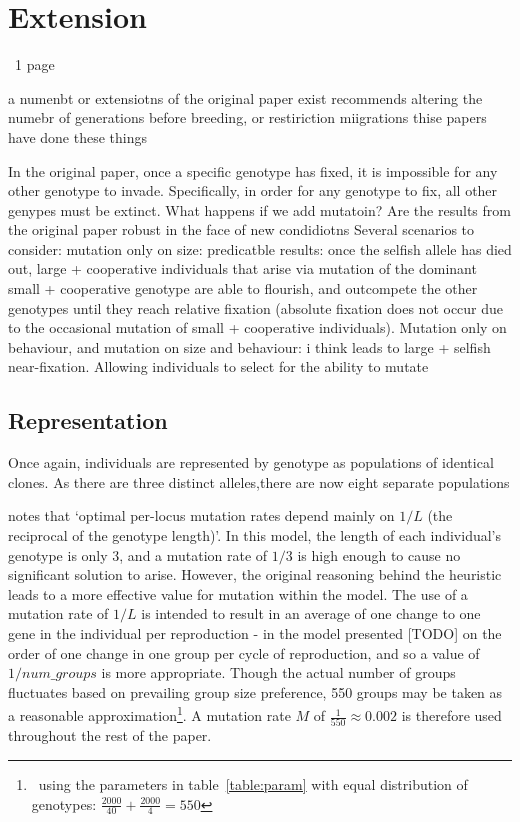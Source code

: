 \documentclass[11pt]{article}
\begin{document}
\section{Extension}
~1 page

a numenbt or extensiotns of the original paper exist
\citet{thesis} recommends altering the numebr of generations before breeding, or restiriction miigrations
thise papers have done these things

In the original paper, once a specific genotype has fixed, it is impossible for any other genotype to invade. Specifically, in order for any genotype to fix, all other genypes must be extinct.
What happens if we add mutatoin?
Are the results from the original paper robust in the face of new condidiotns
Several scenarios to consider:
 mutation only on size: predicatble results: once the selfish allele has died out, large + cooperative individuals that arise via mutation of the dominant small + cooperative genotype are able to flourish, and outcompete the other genotypes until they reach relative fixation (absolute fixation does not occur due to the occasional mutation of small + cooperative individuals).
 Mutation only on behaviour, and mutation on size and behaviour: i think leads to large + selfish near-fixation.
 Allowing individuals to select for the ability to mutate

\subsection{Representation}
Once again, individuals are represented by genotype as populations of identical clones. As there are three distinct alleles,there are now eight separate populations

\citet{optimal} notes that `optimal per-locus mutation rates depend mainly on $1/L$ (the reciprocal of the genotype length)'. In this model, the length of each individual's genotype is only 3, and a mutation rate of $1/3$ is high enough to cause no significant solution to arise. %
However, the original reasoning behind the heuristic leads to a more effective value for mutation within the model. The use of a mutation rate of $1/L$ is intended to result in an average of one change to one gene in the individual per reproduction - in the model presented [TODO]%
on the order of one change in one group per cycle of reproduction, and so a value of $1/num\_groups$ is more appropriate. Though the actual number of groups fluctuates based on prevailing group size preference, 550 groups may be taken as a reasonable approximation\footnote{~using the parameters in table~\ref{table:param} with equal distribution of genotypes: $\frac{2000}{40} + \frac{2000}{4} = 550$}. A mutation rate $M$ of $\frac{1}{550} \approx 0.002$ is therefore used throughout the rest of the paper.
\end{document}
